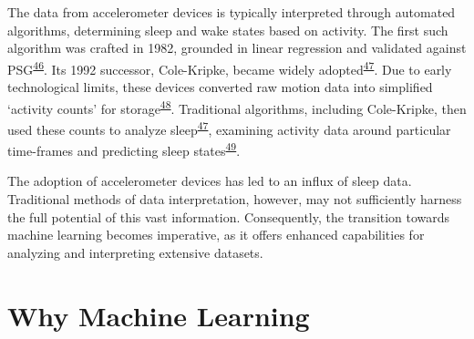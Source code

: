 \documentclass[
  9pt,
]{scrbook}
\begin{document}
The data from accelerometer devices is typically interpreted through
automated algorithms, determining sleep and wake states based on
activity. The first such algorithm was crafted in 1982, grounded in
linear regression and validated against
PSG\textsuperscript{\protect\hyperlink{ref-webster_activity-based_1982}{46}}.
Its 1992 successor, Cole-Kripke, became widely
adopted\textsuperscript{\protect\hyperlink{ref-cole_automatic_1992}{47}}.
Due to early technological limits, these devices converted raw motion
data into simplified `activity counts' for
storage\textsuperscript{\protect\hyperlink{ref-neishabouri_2022}{48}}.
Traditional algorithms, including Cole-Kripke, then used these counts to
analyze
sleep\textsuperscript{\protect\hyperlink{ref-cole_automatic_1992}{47}},
examining activity data around particular time-frames and predicting
sleep
states\textsuperscript{\protect\hyperlink{ref-sazonov_activity-based_2004}{49}}.

The adoption of accelerometer devices has led to an influx of sleep
data. Traditional methods of data interpretation, however, may not
sufficiently harness the full potential of this vast information.
Consequently, the transition towards machine learning becomes
imperative, as it offers enhanced capabilities for analyzing and
interpreting extensive datasets.

\hypertarget{why-machine-learning}{%
\section{Why Machine Learning}\label{why-machine-learning}}
\end{document}
